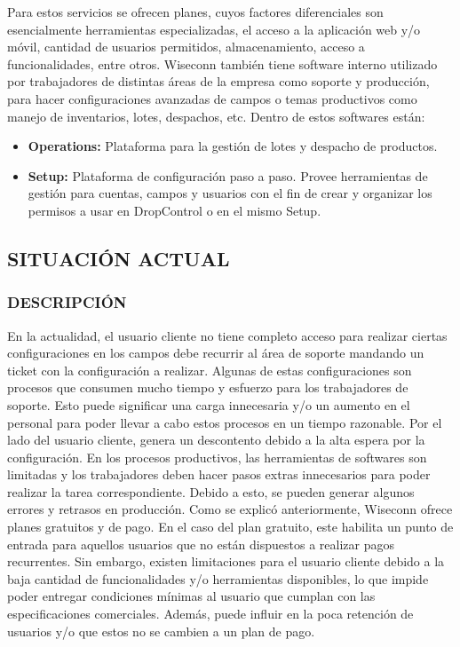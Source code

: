 Para estos servicios se ofrecen planes, cuyos factores diferenciales son esencialmente herramientas especializadas, el acceso a la aplicación web y/o móvil, cantidad de usuarios permitidos, almacenamiento, acceso a funcionalidades, entre otros.
Wiseconn también tiene software interno utilizado por trabajadores de distintas áreas de la empresa como soporte y producción, para hacer configuraciones avanzadas de campos o temas productivos como manejo de inventarios, lotes, despachos, etc. Dentro de estos softwares están:
\begin{itemize}
    \item \textbf{Operations:} Plataforma para la gestión de lotes y despacho de productos.
    \item \textbf{Setup:} Plataforma de configuración paso a paso. Provee herramientas de gestión para cuentas, campos y usuarios con el fin de crear y organizar los permisos a usar en DropControl o en el mismo Setup.
\end{itemize}

\subsection{SITUACIÓN ACTUAL}

\subsubsection{DESCRIPCIÓN}
En la actualidad, el usuario cliente no tiene completo acceso para realizar ciertas configuraciones en los campos debe recurrir al área de soporte mandando un ticket con la configuración a realizar. Algunas de estas configuraciones son procesos que consumen mucho tiempo y esfuerzo para los trabajadores de soporte. Esto puede significar una carga innecesaria y/o un aumento en el personal para poder llevar a cabo estos procesos en un tiempo razonable. Por el lado del usuario cliente, genera un descontento debido a la alta espera por la configuración.
En los procesos productivos, las herramientas de softwares son limitadas y los trabajadores deben hacer pasos extras innecesarios para poder realizar la tarea correspondiente. Debido a esto, se pueden generar algunos errores y retrasos en producción.
Como se explicó anteriormente, Wiseconn ofrece planes gratuitos y de pago. En el caso del plan gratuito, este habilita un punto de entrada para aquellos usuarios que no están dispuestos a realizar pagos recurrentes. Sin embargo, existen limitaciones para el usuario cliente debido a la baja cantidad de funcionalidades y/o herramientas disponibles, lo que impide poder entregar condiciones mínimas al usuario que cumplan con las especificaciones comerciales. Además, puede influir en la poca retención de usuarios y/o que estos no se cambien a un plan de pago.

